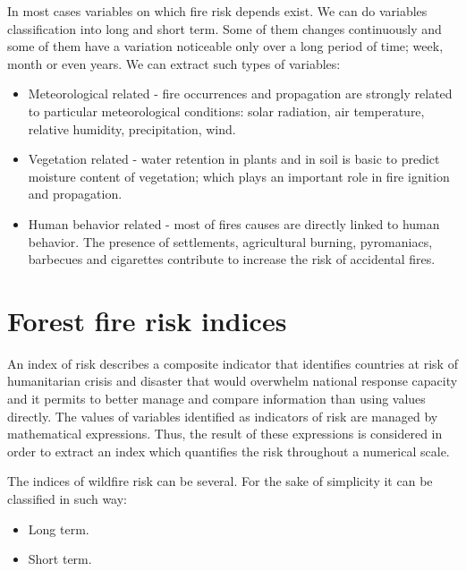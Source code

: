 {{{	In most cases variables on which fire risk depends exist. We can do variables classification into long and short term. Some of them changes continuously and some of them have a variation noticeable only over a long period of time; week, month or even years. We can extract such types of variables:
	
	\begin{itemize}
		\item Meteorological related - fire occurrences and propagation are strongly related to particular meteorological conditions: solar radiation, air temperature, relative humidity, precipitation, wind.
		\item Vegetation related - water retention in plants and in soil is basic to predict moisture content of vegetation; which plays an important role in fire ignition and propagation.
		\item Human behavior related - most of fires causes are directly linked to human behavior. The presence of settlements, agricultural burning, pyromaniacs, barbecues and cigarettes contribute to increase the risk of accidental fires.
	\end{itemize}

\section{Forest fire risk indices}
	An index of risk describes a composite indicator that identifies countries at risk of humanitarian crisis and disaster that would overwhelm national response capacity and it permits to better manage and compare information than using values directly. The values of variables identified as indicators of risk are managed by mathematical expressions. Thus, the result of these expressions is considered in order to extract an index which quantifies the risk throughout a numerical scale.
	
	The indices of wildfire risk can be several. For the sake of simplicity it can be classified in such way:
	
	\begin{itemize}
		\item Long term.
		\item Short term.
	\end{itemize}
	
}}}
